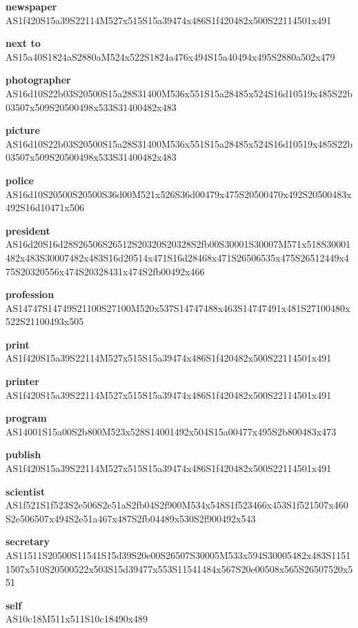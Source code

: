\documentclass{article}
\begin{document}
\begin{glossary}
\textbf{newspaper}\\
AS1f420S15a39S22114M527x515S15a39474x486S1f420482x500S22114501x491

\textbf{next to}\\
AS15a40S1824aS2880aM524x522S1824a476x494S15a40494x495S2880a502x479

\textbf{photographer}\\
AS16d10S22b03S20500S15a28S31400M536x551S15a28485x524S16d10519x485S22b03507x509S20500498x533S31400482x483

\textbf{picture}\\
AS16d10S22b03S20500S15a28S31400M536x551S15a28485x524S16d10519x485S22b03507x509S20500498x533S31400482x483

\textbf{police}\\
AS16d10S20500S20500S36d00M521x526S36d00479x475S20500470x492S20500483x492S16d10471x506

\textbf{president}\\
AS16d20S16d28S26506S26512S20320S20328S2fb00S30001S30007M571x518S30001482x483S30007482x483S16d20514x471S16d28468x471S26506535x475S26512449x475S20320556x474S20328431x474S2fb00492x466

\textbf{profession}\\
AS14747S14749S21100S27100M520x537S14747488x463S14747491x481S27100480x522S21100493x505

\textbf{print}\\
AS1f420S15a39S22114M527x515S15a39474x486S1f420482x500S22114501x491

\textbf{printer}\\
AS1f420S15a39S22114M527x515S15a39474x486S1f420482x500S22114501x491

\textbf{program}\\
AS14001S15a00S2b800M523x528S14001492x504S15a00477x495S2b800483x473

\textbf{publish}\\
AS1f420S15a39S22114M527x515S15a39474x486S1f420482x500S22114501x491

\textbf{scientist}\\
AS1f521S1f523S2e506S2e51aS2fb04S2f900M534x548S1f523466x453S1f521507x460S2e506507x494S2e51a467x487S2fb04489x530S2f900492x543

\textbf{secretary}\\
AS11511S20500S11541S15d39S20e00S26507S30005M533x594S30005482x483S11511507x510S20500522x503S15d39477x553S11541484x567S20e00508x565S26507520x551

\textbf{self}\\
AS10c18M511x511S10c18490x489


\end{glossary}
\end{document}
